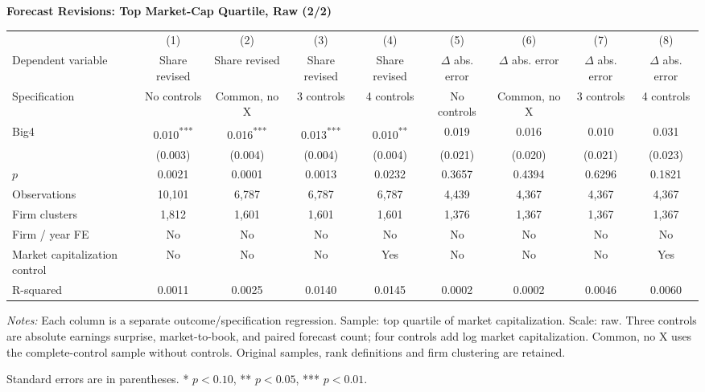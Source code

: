 \documentclass[10pt]{article}
\newcommand{\sym}[1]{\textsuperscript{#1}}
\begin{document}
\begin{minipage}{28.80cm}
\fontsize{10}{12}\selectfont
\setlength{\tabcolsep}{4pt}\renewcommand{\arraystretch}{1.08}
{\large\bfseries Forecast Revisions: Top Market-Cap Quartile, Raw (2/2)}\par\medskip
\begin{tabular*}{\linewidth}{@{\extracolsep{\fill}}lcccccccc@{}}
\toprule
 & (1) & (2) & (3) & (4) & (5) & (6) & (7) & (8) \\
Dependent variable & Share revised & Share revised & Share revised & Share revised & $\Delta$ abs. error & $\Delta$ abs. error & $\Delta$ abs. error & $\Delta$ abs. error \\
Specification & No controls & Common, no X & 3 controls & 4 controls & No controls & Common, no X & 3 controls & 4 controls \\
\midrule
Big4 & 0.010\sym{***} & 0.016\sym{***} & 0.013\sym{***} & 0.010\sym{**} & 0.019 & 0.016 & 0.010 & 0.031 \\
 & (0.003) & (0.004) & (0.004) & (0.004) & (0.021) & (0.020) & (0.021) & (0.023) \\
$p$ & 0.0021 & 0.0001 & 0.0013 & 0.0232 & 0.3657 & 0.4394 & 0.6296 & 0.1821 \\
\midrule
Observations & 10,101 & 6,787 & 6,787 & 6,787 & 4,439 & 4,367 & 4,367 & 4,367 \\
Firm clusters & 1,812 & 1,601 & 1,601 & 1,601 & 1,376 & 1,367 & 1,367 & 1,367 \\
Firm / year FE & No & No & No & No & No & No & No & No \\
Market capitalization control & No & No & No & Yes & No & No & No & Yes \\
R-squared & 0.0011 & 0.0025 & 0.0140 & 0.0145 & 0.0002 & 0.0002 & 0.0046 & 0.0060 \\
\bottomrule\end{tabular*}\par\medskip
\fontsize{9}{11}\selectfont\textit{Notes:} Each column is a separate outcome/specification regression. Sample: top quartile of market capitalization. Scale: raw. Three controls are absolute earnings surprise, market-to-book, and paired forecast count; four controls add log market capitalization. Common, no X uses the complete-control sample without controls. Original samples, rank definitions and firm clustering are retained.
\par Standard errors are in parentheses. * $p<0.10$, ** $p<0.05$, *** $p<0.01$.
\end{minipage}
\end{document}
